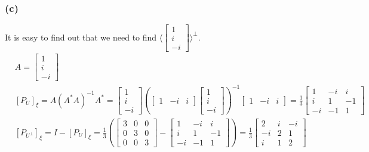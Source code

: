 \documentclass{article}
\begin{document}
\subsubsection*{(c)}
It is easy to find out that we need to find $\langle \begin {bmatrix}
    1 \\ i \\ -i
\end{bmatrix}\rangle ^ {\bot}$. 
\begin{equation*}
    \begin{split}
        &A = \begin{bmatrix}
            1 \\
            i \\
            -i 
        \end{bmatrix}\\
        &[P_U]_\xi = A(A^*A)^{-1}A^* = \begin{bmatrix}
            1 \\
            i \\
            -i  
        \end{bmatrix} (\begin{bmatrix}
            1 & -i & i 
        \end{bmatrix} \begin{bmatrix}
            1 \\
            i \\
            -i 
        \end{bmatrix})^{-1} \begin{bmatrix}
            1 & -i & i 
        \end{bmatrix} = \frac{1}{3}\begin{bmatrix}
                1 & -i & i \\
                i & 1 & -1 \\
                -i & -1 & 1
        \end{bmatrix} \\
        & [P_{U^{\bot}}]_\xi = I - [P_U]_\xi = \frac{1}{3}(\begin{bmatrix}
            3 & 0 & 0 \\
            0 & 3 & 0 \\
            0 & 0 & 3 
    \end{bmatrix} - \begin{bmatrix}
        1 & -i & i \\
        i & 1 & -1 \\
        -i & -1 & 1
        \end{bmatrix}) = \frac{1}{3}\begin{bmatrix}
            2 & i & -i \\
            -i & 2 & 1 \\
            i & 1 & 2
    \end{bmatrix}
    \end{split}
\end{equation*}
\end{document}
